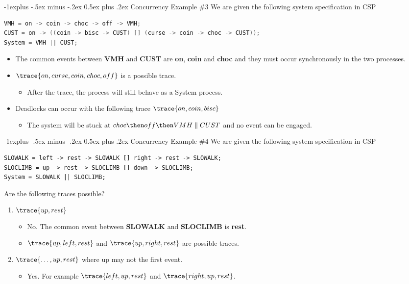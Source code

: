 \documentclass[10pt, landscape]{article}
\makeatletter
\renewcommand{\subsection}{\@startsection{subsection}{2}{0mm}%
  {-1explus -.5ex minus -.2ex}%
  {0.5ex plus .2ex}%
{\normalfont\normalsize\bfseries}}
\makeatother
\begin{document}
\begin{multicols*}{2}
  \subsection{Concurrency Example \#3}
  We are given the following system specification in CSP
\begin{lstlisting}[language=C]
VMH = on -> coin -> choc -> off -> VMH;
CUST = on -> ((coin -> bisc -> CUST) [] (curse -> coin -> choc -> CUST));
System = VMH || CUST;
\end{lstlisting}
  \begin{itemize}
      \item The common events between \textbf{VMH} and \textbf{CUST} are \textbf{on}, \textbf{coin} and \textbf{choc} and they must occur synchronously in the two processes.
      \item $\trace{on, curse, coin, choc, off}$ is a possible trace.
      \begin{itemize}
          \item After the trace, the process will still behave as a System process.
      \end{itemize}
      \item Deadlocks can occur with the following trace $\trace{on, coin, bisc}$
      \begin{itemize}
          \item The system will be stuck at $choc \then off \then VMH \parallel CUST$ and no event can be engaged.
      \end{itemize}
  \end{itemize}
  
  \subsection{Concurrency Example \#4}
  We are given the following system specification in CSP
\begin{lstlisting}
SLOWALK = left -> rest -> SLOWALK [] right -> rest -> SLOWALK;
SLOCLIMB = up -> rest -> SLOCLIMB [] down -> SLOCLIMB;
System = SLOWALK || SLOCLIMB;
\end{lstlisting}
  
  Are the following traces possible?
  \begin{enumerate}
    \item $\trace{up, rest}$
    \begin{itemize}
        \item No. The common event between \textbf{SLOWALK} and \textbf{SLOCLIMB} is \textbf{rest}.
        \item $\trace{up, left, rest}$ and $\trace{up, right, rest}$ are possible traces.
    \end{itemize}
    \item $\trace{\ldots, up, rest}$ where up may not the first event.
    \begin{itemize}
        \item Yes. For example $\trace{left, up, rest}$ and $\trace{right, up, rest}$.
    \end{itemize}
  \end{enumerate}


\end{multicols*}
\end{document}
